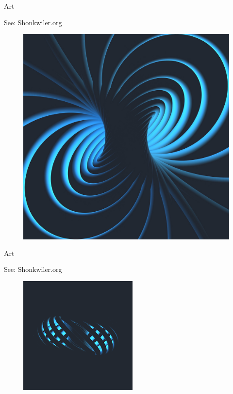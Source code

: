 \documentclass[usenames,dvipsnames]{beamer}
\theoremstyle{definition}
\theoremstyle{theorem}
\begin{document}
    \begin{frame}{Art}
    \begin{center}
        See: Shonkwiler.org
        \begin{figure}
            \centering
            \includegraphics[width=.6\textwidth]{33700724514_35273ae7ca_b.jpg}
        \end{figure}
        \end{center}
    \end{frame}
    
        \begin{frame}{Art}
    \begin{center}
        See: Shonkwiler.org
        \begin{figure}
            \centering
            \includegraphics[width=.6\textwidth]{download.png}
        \end{figure}
        \end{center}
    \end{frame}
    
\end{document}
